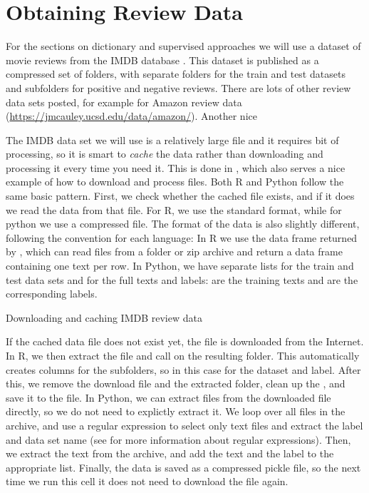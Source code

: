 \section{Obtaining Review Data}

For the sections on dictionary and supervised approaches we will use a dataset of movie reviews
from the IMDB database \citet{aclimdb}.
This dataset is published as a compressed set of folders, with separate folders for the train and test datasets and subfolders for positive and negative reviews.
There are lots of other review data sets posted, for example for Amazon review data (\url{https://jmcauley.ucsd.edu/data/amazon/}). Another nice 

The IMDB data set we will use is a relatively large file and it requires bit of processing,
so it is smart to \emph{cache} the data rather than downloading and processing it every time you need it.
This is done in , which also serves a nice example of how to download and process files.
Both R and Python follow the same basic pattern.
First, we check whether the cached file exists, and if it does we read the data from that file.
For R, we use the standard  format, while for python we use a compressed  file.
The format of the data is also slightly different, following the convention for each language:
In R we use the data frame returned by ,
which can read files from a folder or zip archive and return a data frame containing one text per row.
In Python, we have separate lists for the train and test data sets and for the full texts and labels:
 are the training texts and  are the corresponding labels.

\begin{ccsexample}
  \caption{Downloading and caching IMDB review data}\label{ex:reviewdata}
\end{ccsexample}

If the cached data file does not exist yet,
the file is downloaded from the Internet.
In R, we then extract the file and call  on the resulting folder.
This automatically creates columns for the subfolders, so in this case for the dataset and label.
After this, we remove the download file and the extracted folder,
clean up the , and save it to the  file.
In Python, we can extract files from the downloaded file directly,
so we do not need to explictly extract it.
We loop over all files in the archive, and use a regular expression to
select only text files and extract the label and data set name
(see  for more information about regular expressions).
Then, we extract the text from the archive, and add the text and the label to the appropriate list.
Finally, the data is saved as a compressed pickle file,
so the next time we run this cell it does not need to download the file again. 

